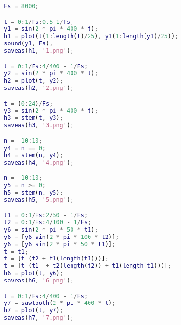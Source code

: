 \documentclass[11pt, a4paper]{article}
\begin{document}
\begin{lstlisting}[language=matlab, frame=single]
Fs = 8000;                                         

t = 0:1/Fs:0.5-1/Fs;                              
y1 = sin(2 * pi * 400 * t);                       
h1 = plot(t(1:length(t)/25), y1(1:length(y1)/25));
sound(y1, Fs);                                    
saveas(h1, '1.png');                              

t = 0:1/Fs:4/400 - 1/Fs;
y2 = sin(2 * pi * 400 * t);
h2 = plot(t, y2);
saveas(h2, '2.png');

t = (0:24)/Fs;
y3 = sin(2 * pi * 400 * t);
h3 = stem(t, y3); 
saveas(h3, '3.png');

n = -10:10;
y4 = n == 0;
h4 = stem(n, y4);
saveas(h4, '4.png');

n = -10:10;
y5 = n >= 0;
h5 = stem(n, y5);
saveas(h5, '5.png');

t1 = 0:1/Fs:2/50 - 1/Fs;
t2 = 0:1/Fs:4/100 - 1/Fs;
y6 = sin(2 * pi * 50 * t1);
y6 = [y6 sin(2 * pi * 100 * t2)];
y6 = [y6 sin(2 * pi * 50 * t1)];
t = t1; 
t = [t (t2 + t1(length(t1)))];
t = [t (t1  + t2(length(t2)) + t1(length(t1)))];
h6 = plot(t, y6);
saveas(h6, '6.png');

t = 0:1/Fs:4/400 - 1/Fs;
y7 = sawtooth(2 * pi * 400 * t);
h7 = plot(t, y7);
saveas(h7, '7.png');
\end{lstlisting}
\end{document}
